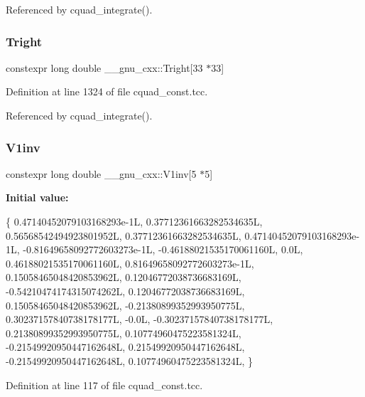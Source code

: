 Referenced by cquad\+\_\+integrate().

\mbox{\label{namespace____gnu__cxx_aa35b50708b727cd96920850c90482637}} 
\subsubsection{\texorpdfstring{Tright}{Tright}}
{\footnotesize\ttfamily constexpr long double \+\_\+\+\_\+gnu\+\_\+cxx\+::\+Tright\mbox{[}33 $\ast$33\mbox{]}}



Definition at line 1324 of file cquad\+\_\+const.\+tcc.



Referenced by cquad\+\_\+integrate().

\mbox{\label{namespace____gnu__cxx_abac562ad4a226ad8799434617959af3d}} 
\subsubsection{\texorpdfstring{V1inv}{V1inv}}
{\footnotesize\ttfamily constexpr long double \+\_\+\+\_\+gnu\+\_\+cxx\+::\+V1inv\mbox{[}5 $\ast$5\mbox{]}}

{\bfseries Initial value\+:}
\begin{DoxyCode}
\{
   0.47140452079103168293e-1L,  0.37712361663282534635L,
   0.56568542494923801952L,
   0.37712361663282534635L,  0.47140452079103168293e-1L,
  -0.81649658092772603273e-1L, -0.46188021535170061160L, 0.0L,
   0.46188021535170061160L,  0.81649658092772603273e-1L,
   0.15058465048420853962L,
   0.12046772038736683169L, -0.54210474174315074262L,  0.12046772038736683169L,
   0.15058465048420853962L, -0.21380899352993950775L,  0.30237157840738178177L,
  -0.0L,
  -0.30237157840738178177L,  0.21380899352993950775L,  0.10774960475223581324L,
  -0.21549920950447162648L,  0.21549920950447162648L, -0.21549920950447162648L,
   0.10774960475223581324L,
\}
\end{DoxyCode}


Definition at line 117 of file cquad\+\_\+const.\+tcc.



